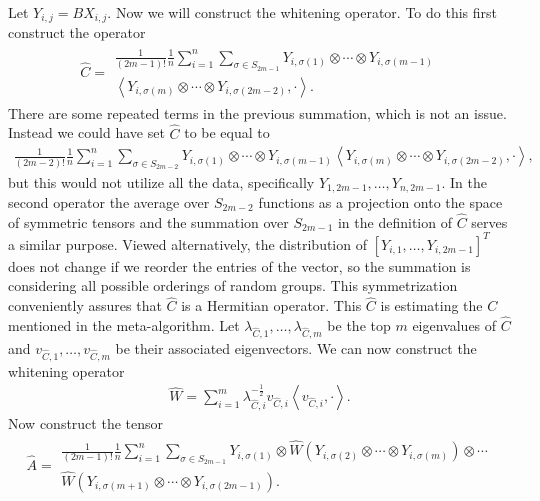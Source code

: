 \documentclass[aos,preprint]{imsart}
\def\l{\left}
\def\r{\right}
\theoremstyle{plain}
\theoremstyle{defintion}
\begin{document}
Let $Y_{i,j} = B X_{i,j}$. Now we will construct the whitening operator. To do this first construct the operator 
\begin{eqnarray*}
	\widehat{C} =
	\begin{split}\frac{1}{\left( 2m-1 \right)!}\frac{1}{n} \sum_{i=1}^n \sum_{\sigma \in S_{2m-1}} Y_{i,\sigma\left( 1 \right)} \otimes \cdots \otimes Y_{i,\sigma\left( m-1 \right)}\\
	\l<Y_{i, \sigma \left( m \right)} \otimes \cdots \otimes Y_{i, \sigma \left( 2m-2 \right)}, \cdot \r>.\end{split}
\end{eqnarray*}
There are some repeated terms in the previous summation, which is not an issue. Instead we could have set $\widehat{C}$ to be equal to \small
\begin{eqnarray*}
	\frac{1}{\left( 2m-2 \right)!}\frac{1}{n} \sum_{i=1}^n \sum_{\sigma \in S_{2m-2}} Y_{i,\sigma\left( 1 \right)} \otimes \cdots \otimes Y_{i,\sigma\left( m-1 \right)}\l<Y_{i, \sigma \left( m \right)} \otimes \cdots \otimes Y_{i, \sigma \left( 2m-2 \right)}, \cdot \r>,
\end{eqnarray*} \normalsize
but this would not utilize all the data, specifically $Y_{1,2m-1},\ldots, Y_{n,2m-1}$. In the second operator the average over $S_{2m-2}$ functions as a projection onto the space of symmetric tensors and the summation over $S_{2m-1}$ in the definition of $\widehat{C}$ serves a similar purpose. Viewed alternatively, the distribution of $[Y_{i,1}, \ldots, Y_{i,2m-1}]^T$ does not change if we reorder the entries of the vector, so the summation is considering all possible orderings of random groups. This symmetrization conveniently assures that $\widehat{C}$ is a Hermitian operator.
This $\widehat{C}$ is estimating the $C$ mentioned in the meta-algorithm. Let $\lambda_{\widehat{C},1}, \ldots, \lambda_{\widehat{C},m}$ be the top $m$ eigenvalues of $\widehat{C}$ and $v_{\widehat{C},1},\ldots,v_{\widehat{C},m}$ be their associated eigenvectors. We can now construct the whitening operator
\begin{eqnarray*}
	\widehat{W} = \sum_{i=1}^m \lambda_{\widehat{C},i}^{-\frac{1}{2}} v_{\widehat{C},i} \l<v_{\widehat{C},i}, \cdot\r>.
\end{eqnarray*}
Now construct the tensor
\begin{eqnarray*}
	\widehat{A} = 
	\begin{split}
		\frac{1}{\left( 2m-1 \right)!} \frac{1}{n} \sum_{i=1}^n \sum_{\sigma \in S_{2m-1}} Y_{i,\sigma\left( 1 \right)} \otimes \widehat{W} \left( Y_{i,\sigma\left( 2 \right)} \otimes \cdots \otimes Y_{i,\sigma\left( m \right)} \right) \otimes \cdots\\
		\widehat{W}\left( Y_{i,\sigma\left( m+1 \right)} \otimes \cdots \otimes Y_{i,\sigma\left( 2m-1 \right)} \right).
	\end{split}
\end{eqnarray*}
\end{document}
